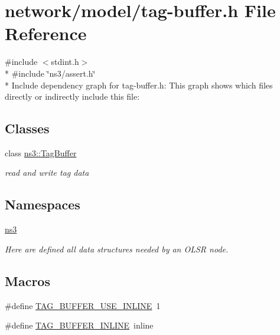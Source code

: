 \hypertarget{tag-buffer_8h}{}\section{network/model/tag-\/buffer.h File Reference}
\label{tag-buffer_8h}
{\ttfamily \#include $<$stdint.\+h$>$}\\*
{\ttfamily \#include \char`\"{}ns3/assert.\+h\char`\"{}}\\*
Include dependency graph for tag-\/buffer.h\+:
This graph shows which files directly or indirectly include this file\+:
\subsection*{Classes}
\begin{DoxyCompactItemize}
\item 
class \hyperlink{classns3_1_1TagBuffer}{ns3\+::\+Tag\+Buffer}
\begin{DoxyCompactList}\small\item\em read and write tag data \end{DoxyCompactList}\end{DoxyCompactItemize}
\subsection*{Namespaces}
\begin{DoxyCompactItemize}
\item 
 \hyperlink{namespacens3}{ns3}
\begin{DoxyCompactList}\small\item\em Here are defined all data structures needed by an O\+L\+SR node. \end{DoxyCompactList}\end{DoxyCompactItemize}
\subsection*{Macros}
\begin{DoxyCompactItemize}
\item 
\#define \hyperlink{tag-buffer_8h_accbc44f1b4b97b82dff48323e0dc0a13}{T\+A\+G\+\_\+\+B\+U\+F\+F\+E\+R\+\_\+\+U\+S\+E\+\_\+\+I\+N\+L\+I\+NE}~1
\item 
\#define \hyperlink{tag-buffer_8h_a8e389298c53aa29f5ba6ee36ab9c8057}{T\+A\+G\+\_\+\+B\+U\+F\+F\+E\+R\+\_\+\+I\+N\+L\+I\+NE}~inline
\end{DoxyCompactItemize}


